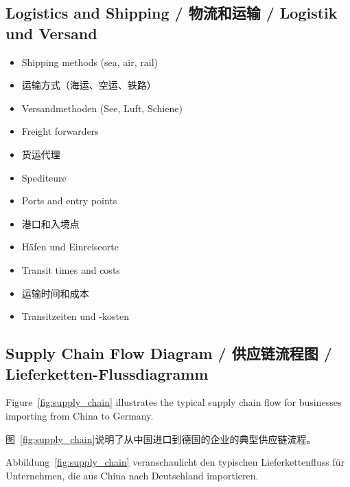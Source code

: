 \subsection{Logistics and Shipping / 物流和运输 / Logistik und Versand}
\begin{itemize}
    \item Shipping methods (sea, air, rail)
    \item 运输方式（海运、空运、铁路）
    \item Versandmethoden (See, Luft, Schiene)
    \item Freight forwarders
    \item 货运代理
    \item Spediteure
    \item Ports and entry points
    \item 港口和入境点
    \item Häfen und Einreiseorte
    \item Transit times and costs
    \item 运输时间和成本
    \item Transitzeiten und -kosten
\end{itemize}

\subsection{Supply Chain Flow Diagram / 供应链流程图 / Lieferketten-Flussdiagramm}

Figure~\ref{fig:supply_chain} illustrates the typical supply chain flow for businesses importing from China to Germany.

图~\ref{fig:supply_chain}说明了从中国进口到德国的企业的典型供应链流程。

Abbildung~\ref{fig:supply_chain} veranschaulicht den typischen Lieferkettenfluss für Unternehmen, die aus China nach Deutschland importieren.

